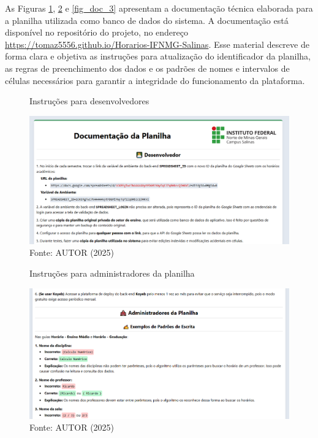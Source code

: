 As Figuras \ref{fig_doc_1}, \ref{fig_doc_2} e \ref{fig_doc_3} apresentam a documentação técnica elaborada para a planilha utilizada como banco de dados do sistema. A documentação está disponível no repositório do projeto, no endereço \url{https://tomaz5556.github.io/Horarios-IFNMG-Salinas}. Esse material descreve de forma clara e objetiva as instruções para atualização do identificador da planilha, as regras de preenchimento dos dados e os padrões de nomes e intervalos de células necessários para garantir a integridade do funcionamento da plataforma.

\begin{figure}[H]
    \centering
    \caption{Instruções para desenvolvedores}
    \includegraphics[width=1\textwidth]{Figuras/doc-1.png}
    \caption*{Fonte: AUTOR (2025)}
    \label{fig_doc_1}
\end{figure}

\begin{figure}[htb]
    \centering
    \caption{Instruções para administradores da planilha}
    \includegraphics[width=1\textwidth]{Figuras/doc-2.png}
    \caption*{Fonte: AUTOR (2025)}
    \label{fig_doc_2}
\end{figure}

